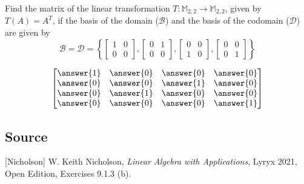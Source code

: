\documentclass{ximera}
\author{}
\begin{document}
\begin{exercise}
Find the matrix of the linear transformation $T:\mathbb{M}_{2,2}\rightarrow \mathbb{M}_{2,2}$, given by $T(A)=A^T$, if the basis of the domain ($\mathcal{B}$) and the basis of the codomain ($\mathcal{D}$) are given by
$$\mathcal{B}=\mathcal{D}=\left\{\begin{bmatrix}1 & 0\\0 & 0\end{bmatrix},\begin{bmatrix}0 & 1\\0 & 0\end{bmatrix}, \begin{bmatrix}0 & 0\\1 & 0\end{bmatrix}, \begin{bmatrix}0 & 0\\0 & 1\end{bmatrix}\right\} $$

$$\begin{bmatrix}\answer{1} & \answer{0} & \answer{0} & \answer{0}\\\answer{0} & \answer{0} & \answer{1} & \answer{0}\\\answer{0} & \answer{1} & \answer{0} & \answer{0}\\\answer{0} & \answer{0} & \answer{0} & \answer{1}\end{bmatrix}$$
 \end{exercise}

\subsection*{Source}
[Nicholson] W. Keith Nicholson, {\it Linear Algebra with Applications}, Lyryx 2021, Open Edition, Exercises 9.1.3 (b).  
\end{document}
